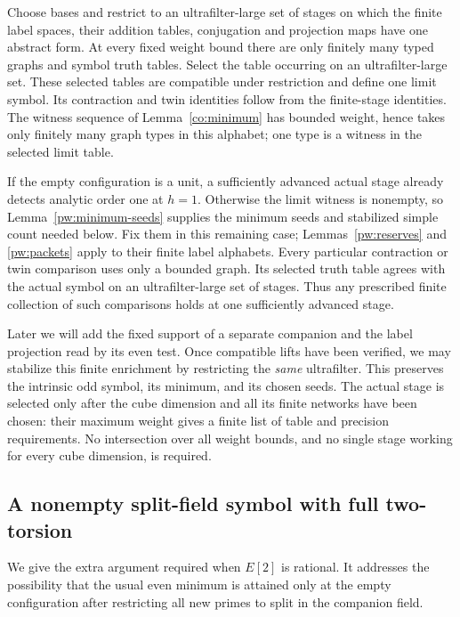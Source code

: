 Choose bases and restrict to an ultrafilter-large set of stages on which
the finite label spaces, their addition tables, conjugation and projection
maps have one abstract form.  At every fixed weight bound there are only
finitely many typed graphs and symbol truth tables.  Select the table
occurring on an ultrafilter-large set.  These selected tables are
compatible under restriction and define one limit symbol.  Its contraction
and twin identities follow from the finite-stage identities.  The witness
sequence of Lemma~\ref{co:minimum} has bounded weight, hence takes only
finitely many graph types in this alphabet; one type is a witness in the
selected limit table.

If the empty configuration is a unit, a sufficiently advanced actual stage
already detects analytic order one at $h=1$.  Otherwise the limit witness
is nonempty, so Lemma~\ref{pw:minimum-seeds} supplies the minimum seeds
and stabilized simple count needed below.  Fix them in this remaining
case; Lemmas~\ref{pw:reserves} and \ref{pw:packets} apply to their finite
label alphabets.  Every
particular contraction or twin comparison uses only a bounded graph.
Its selected truth table agrees with the actual symbol on an
ultrafilter-large set of stages.  Thus any prescribed finite collection
of such comparisons holds at one sufficiently advanced stage.

Later we will add the fixed support of a separate companion and the label
projection read by its even test.  Once compatible lifts have been
verified, we may stabilize this finite enrichment by restricting the
\emph{same} ultrafilter.  This preserves the intrinsic odd symbol, its
minimum, and its chosen seeds.  The actual stage is selected only after
the cube dimension and all its finite networks have been chosen: their
maximum weight gives a finite list of table and precision requirements.
No intersection over all weight bounds, and no single stage working for
every cube dimension, is required.

\subsection{A nonempty split-field symbol with full two-torsion}
\label{pw:split-section}

We give the extra argument required when $E[2]$ is rational.  It addresses
the possibility that the usual even minimum is attained only at the empty
configuration after restricting all new primes to split in the companion
field.


